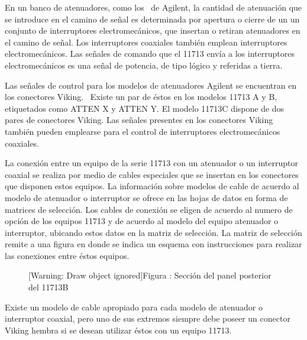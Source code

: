 \documentclass[paper=letter,oneside,fontsize=10pt,parskip=full]{article}
\newcounter{Drawing}
\renewcommand\theDrawing{\arabic{Drawing}}
\begin{document}
\bigskip

En un banco de atenuadores, como los \ de Agilent, la cantidad de atenuación que se introduce en el camino de señal es
determinada por apertura o cierre de un un conjunto de interruptores electromecánicos, que insertan o retiran
atenuadores en el camino de señal. Los interruptores coaxiales también emplean interruptores electromecánicos. Las
señales de comando que el 11713 envía a los interruptores electromecánicos es una señal de potencia, de tipo lógico y
referidas a tierra.

Las señales de control para los modelos de atenuadores Agilent se encuentran en los conectores Viking. \ Existe un par
de éstos en los modelos 11713 A y B, etiquetados como ATTEN X y ATTEN Y. El modelo 11713C dispone de dos pares de
conectores Viking. Las señales presentes en los conectores Viking también pueden emplearse para el control de
interruptores electromecánicos coaxiales.

La conexión entre un equipo de la serie 11713 con un atenuador o un interruptor coaxial se realiza por medio de cables
especiales que se insertan en los conectores que disponen estos equipos. La información sobre modelos de cable de
acuerdo al modelo de atenuador o interruptor se ofrece en las hojas de datos en forma de matrices de selección. Los
cables de conexión se eligen de acuerdo al numero de opción de los equipos 11713 y de acuerdo al modelo del equipo
atenuador o interruptor, ubicando estos datos en la matriz de selección. La matriz de selección remite a una figura en
donde se indica un esquema con instrucciones para realizar las conexiones entre éstos equipos. 

\begin{figure}
\centering
\begin{minipage}{17.157cm}
[Warning: Draw object ignored]Figura \stepcounter{Drawing}{\theDrawing}: Sección del panel posterior del 11713B
\end{minipage}
\end{figure}
Existe un modelo de cable apropiado para cada modelo de atenuador o interruptor coaxial, pero uno de sus extremos
siempre debe poseer un conector Viking hembra si se desean utilizar éstos con un equipo 11713. 
\end{document}
